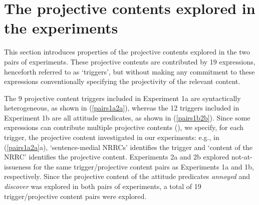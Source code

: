 \documentclass[11pt,fleqn]{article}
\newcommand{\6}{\mbox{$[\hspace*{-.6mm}[$}}
\newcommand{\9}{\mbox{$]\hspace*{-.6mm}]$}}
\begin{document}
\section{The projective contents explored in the experiments}\label{s2}

This section introduces properties of the projective contents explored in the two pairs of experiments. These projective contents are contributed by 19 expressions, henceforth referred to as `triggers', but without making any commitment to these expressions conventionally specifying the projectivity of the relevant content. 

The 9 projective content triggers included in Experiment 1a are syntactically heterogeneous, as shown in (\ref{pairs1a2a}), whereas the 12 triggers included in Experiment 1b are all attitude predicates, as shown in (\ref{pairs1b2b}). Since some expressions can contribute multiple projective contents (\citealt{brst-lang11}), we specify, for each trigger, the projective content investigated in our experiments: e.g., in (\ref{pairs1a2a}a), `sentence-medial NRRCs' identifies the trigger and `content of the NRRC' identifies the projective content. Experiments 2a and 2b explored not-at-issueness for the same trigger/projective content pairs as Experiments 1a and 1b, respectively. Since the projective content of the attitude predicates {\em annoyed} and {\em discover} was explored in both pairs of experiments, a total of 19 trigger/projective content pairs were explored. 
\end{document}
